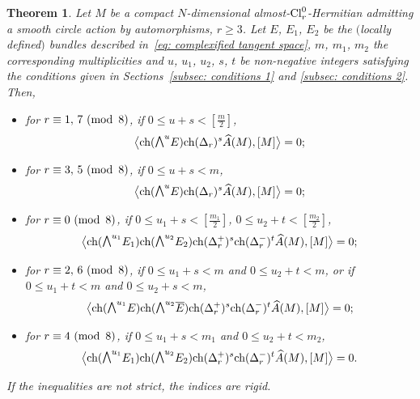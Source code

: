 \documentclass[pdftex]{sigma}
\newcommand{\A}{\mbox{$\widehat A$}}
\newcommand{\ext}{\raise1pt\hbox{$\textstyle\bigwedge$}}
\newcommand{\ch}{\mbox{\rm ch}}
\numberwithin{equation}{section}
\newtheorem{Theorem}{Theorem}[section]
\begin{document}
\begin{Theorem}\label{theo: vanishing 1} Let $M$ be a compact $N$-dimensional almost-${\rm Cl}_r^0$-Hermitian admitting a smooth circle action by automorphisms, $r\geq 3$. Let $E$, $E_1$, $E_2$ be the $($locally defined$)$ bundles described in~\eqref{eq: complexified tangent space}, $m$, $m_1$, $m_2$ the corresponding multiplicities and $u$, $u_1$, $u_2$, $s$, $t$ be non-negative integers satisfying the conditions given in Sections~{\rm \ref{subsec: conditions 1}} and {\rm \ref{subsec: conditions 2}}. Then,
\begin{itemize}\itemsep=0pt
\item for $r\equiv 1,\, 7 \,\,({\rm mod\,\,\,} 8)$, if $0\leq u+s<[\frac{m}{2}]$,
\begin{gather*}\big\langle \ch(\ext^u E)\ch(\Delta_r)^s\A(M),[M]\big\rangle =0;\end{gather*}

\item for $r\equiv 3,\, 5 \,\,({\rm mod\,\,\,} 8)$, if $0\leq u+s<m$,
 \begin{gather*}\big\langle \ch(\ext^u E)\ch(\Delta_r)^s\A(M),[M]\big\rangle =0;\end{gather*}

\item for $r\equiv 0 \,\,({\rm mod\,\,\,} 8)$, if $0\leq u_1+s<[\frac{m_1}{2}]$, $0\leq u_2+t<[\frac{m_2}{2}]$,
\begin{gather*}\big\langle \ch(\ext^{u_1} E_1)\ch(\ext^{u_2} E_2)\ch(\Delta_r^+)^{s}\ch(\Delta_r^-)^{t}\A(M),[M]\big\rangle =0;\end{gather*}

\item for $r\equiv 2,\, 6 \,\,({\rm mod\,\,\,} 8)$, if $0\leq u_1+s<m$ and $0 \leq u_2+t <m$, or if $0\leq u_1+t<m$ and $0 \leq u_2+s <m$,
\begin{gather*}\big\langle \ch(\ext^{u_1} E)\ch(\ext^{u_2} \overline{E})\ch(\Delta_r^+)^{s}\ch(\Delta_r^-)^{t}\A(M),[M]\big\rangle =0;\end{gather*}

\item for $r\equiv 4 \,\,({\rm mod\,\,\,} 8)$, if $0\leq u_1+s<m_1$ and $0\leq u_2+t<m_2$,
\begin{gather*}\big\langle \ch(\ext^{u_1} E_1)\ch(\ext^{u_2} E_2)\ch(\Delta_r^+)^{s}\ch(\Delta_r^-)^{t}\A(M),[M]\big\rangle =0.\end{gather*}
\end{itemize}
If the inequalities are not strict, the indices are rigid.
\end{Theorem}
\end{document}
